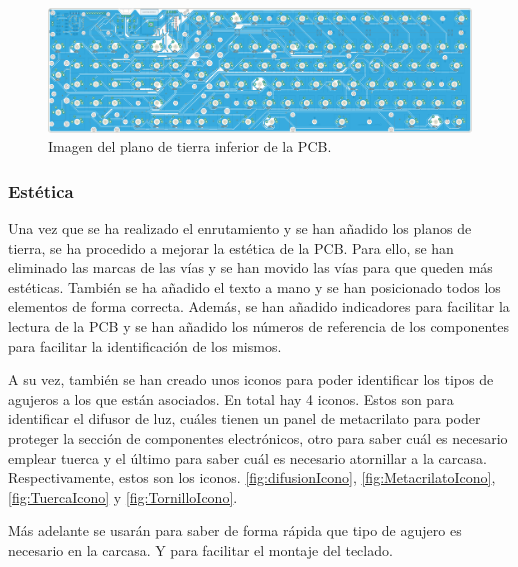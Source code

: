 \begin{figure}[H]
    \centering
    \includegraphics[width=1\textwidth]{imagenes/Capitulos/Cap05/EaglePCBPlanoTierra2.png}
    \caption{Imagen del plano de tierra inferior de la \gls{PCB}.}
    \label{fig:EaglePCBPlanoTierra2}
\end{figure}

\subsubsection{Estética}
Una vez que se ha realizado el enrutamiento y se han añadido los planos de tierra, se ha procedido a mejorar la estética de la \gls{PCB}. Para ello, se han eliminado las marcas de las vías y se han movido las vías para que queden más estéticas. También se ha añadido el texto a mano y se han posicionado todos los elementos de forma correcta. Además, se han añadido indicadores para facilitar la lectura de la \gls{PCB} y se han añadido los números de referencia de los componentes para facilitar la identificación de los mismos.

A su vez, también se han creado unos iconos para poder identificar los tipos de agujeros a los que están asociados. En total hay 4 iconos. Estos son para identificar el difusor de luz, cuáles tienen un panel de metacrilato para poder proteger la sección de componentes electrónicos, otro para saber cuál es necesario emplear tuerca y el último para saber cuál es necesario atornillar a la carcasa. Respectivamente, estos son los iconos. \ref{fig:difusionIcono}, \ref{fig:MetacrilatoIcono}, \ref{fig:TuercaIcono} y \ref{fig:TornilloIcono}.

Más adelante se usarán para saber de forma rápida que tipo de agujero es necesario en la carcasa. Y para facilitar el montaje del teclado.

